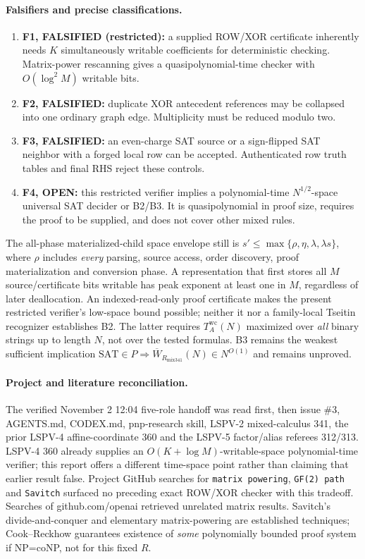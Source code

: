 \documentclass[11pt]{article}
\begin{document}
\paragraph{Falsifiers and precise classifications.}
\begin{enumerate}
\item[] \textbf{F1, FALSIFIED (restricted):} a supplied ROW/XOR certificate inherently needs $K$ simultaneously writable coefficients for deterministic checking. Matrix-power rescanning gives a quasipolynomial-time checker with $O(\log^2 M)$ writable bits.
\item[] \textbf{F2, FALSIFIED:} duplicate XOR antecedent references may be collapsed into one ordinary graph edge. Multiplicity must be reduced modulo two.
\item[] \textbf{F3, FALSIFIED:} an even-charge SAT source or a sign-flipped SAT neighbor with a forged local row can be accepted. Authenticated row truth tables and final RHS reject these controls.
\item[] \textbf{F4, OPEN:} this restricted verifier implies a polynomial-time $N^{1/2}$-space universal SAT decider or B2/B3. It is quasipolynomial in proof size, requires the proof to be supplied, and does not cover other mixed rules.
\end{enumerate}
The all-phase materialized-child space envelope still is $s'\le\max\{\rho,\eta,\lambda,\lambda s\}$, where $\rho$ includes \emph{every} parsing, source access, order discovery, proof materialization and conversion phase. A representation that first stores all $M$ source/certificate bits writable has peak exponent at least one in $M$, regardless of later deallocation. An indexed-read-only proof certificate makes the present restricted verifier's low-space bound possible; neither it nor a family-local Tseitin recognizer establishes B2. The latter requires $T_A^{\mathrm{wc}}(N)$ maximized over \emph{all} binary strings up to length $N$, not over the tested formulas. B3 remains the weakest sufficient implication $\mathrm{SAT}\in P\Rightarrow \overline W_{R_{\mathrm{mix341}}}(N)\in N^{O(1)}$ and remains unproved.

\paragraph{Project and literature reconciliation.}
The verified November 2 12:04 five-role handoff was read first, then issue \#3, AGENTS.md, CODEX.md, pnp-research skill, LSPV-2 mixed-calculus 341, the prior LSPV-4 affine-coordinate 360 and the LSPV-5 factor/alias referees 312/313. LSPV-4 360 already supplies an $O(K+\log M)$-writable-space polynomial-time verifier; this report offers a different time-space point rather than claiming that earlier result false. Project GitHub searches for \texttt{matrix powering}, \texttt{GF(2) path} and \texttt{Savitch} surfaced no preceding exact ROW/XOR checker with this tradeoff. Searches of github.com/openai retrieved unrelated matrix results. Savitch's divide-and-conquer and elementary matrix-powering are established techniques; Cook--Reckhow guarantees existence of \emph{some} polynomially bounded proof system if NP=coNP, not for this fixed $R$.
\end{document}
